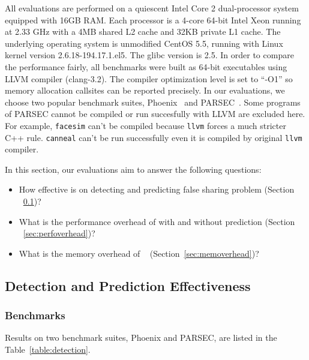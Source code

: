\label{sec:evaluation}

All evaluations are performed on a quiescent Intel Core 2 dual-processor system equipped with 
16GB RAM. 
Each processor is a 4-core 64-bit Intel Xeon running at 2.33 GHz with a 4MB
shared L2 cache and 32KB private L1 cache. 
The underlying operating system is unmodified CentOS 5.5, running with Linux kernel
version 2.6.18-194.17.1.el5. The glibc version is 2.5. 
In order to compare the performance fairly, all benchmarks were built as 64-bit executables 
using LLVM compiler (clang-3.2). The compiler optimization level is set to ``-O1'' 
so memory allocation callsites can be reported precisely.
In our evaluations, 
we choose two popular benchmark suites, Phoenix~\cite{phoenix-hpca} 
and PARSEC~\cite{parsec}. 
Some programs of PARSEC cannot be compiled or run succesfully with LLVM are excluded here.
For example, \texttt{facesim} can't be compiled 
because \texttt{llvm} forces a much stricter C++ rule. 
\texttt{canneal} can't be run successfully even it is compiled by original \texttt{llvm} compiler.

In this section, our evaluations aim to answer the following questions:
\begin{itemize}
\item
  How effective is \Predator{} on detecting and predicting false sharing problem (Section ~\ref{sec:effective})?

\item
  What is the performance overhead of \Predator{} with and without prediction
  (Section ~\ref{sec:perfoverhead})?

\item
  What is the memory overhead of \Predator{}~ (Section~\ref{sec:memoverhead})?
\end{itemize}


\subsection{Detection and Prediction Effectiveness}
\label{sec:effective}

\subsubsection{Benchmarks}
\label{sec:benchmarks}
Results on two benchmark suites, Phoenix and PARSEC, 
are listed in the Table~\ref{table:detection}. 



